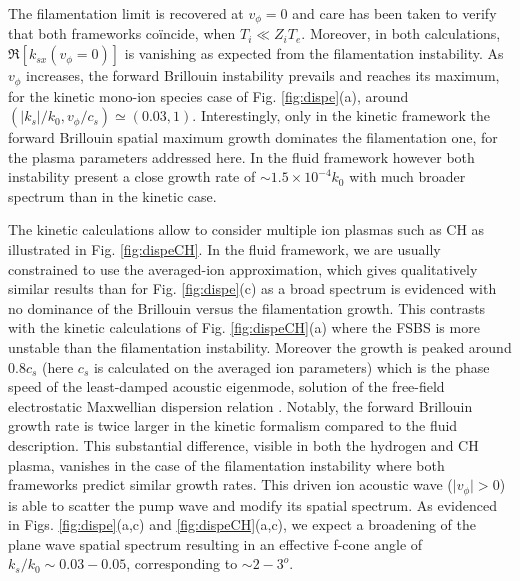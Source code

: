 \documentclass[
 reprint,
 superscriptaddress,
 amsmath,amssymb,
 aps,
]{revtex4-1}
\begin{document}
The filamentation limit is recovered at $v_\phi=0$ and care has been taken to verify that both frameworks co\"incide, when $T_i\ll Z_iT_e$. Moreover, in both calculations, $\Re[k_{sx}(v_\phi=0)]$ is vanishing as expected from the filamentation instability. As $v_\phi$ increases, the forward Brillouin instability prevails and reaches its maximum, for the kinetic  mono-ion species case of Fig. \ref{fig:dispe}(a), around $(\vert k_s\vert/k_0, v_\phi/c_s) \simeq(0.03,1)$. Interestingly, only in the kinetic framework  the forward Brillouin spatial maximum  growth dominates the filamentation one, for the plasma parameters addressed here. In the fluid framework however both instability present a close  growth rate of $\sim 1.5\times 10^{-4} k_0$  with much  broader  spectrum than in the kinetic case.

The kinetic calculations allow to consider multiple ion plasmas such as CH as illustrated in Fig. \ref{fig:dispeCH}. In the fluid framework, we are usually constrained to use the averaged-ion approximation, which gives qualitatively similar results than for Fig. \ref{fig:dispe}(c) as a broad spectrum is evidenced with no dominance of the Brillouin versus the filamentation growth. This contrasts with the kinetic calculations of Fig. \ref{fig:dispeCH}(a) where the FSBS is more unstable than the filamentation instability. Moreover the growth is peaked around $0.8c_s$ (here $c_s$ is calculated on the averaged ion parameters) which is the phase speed of the least-damped acoustic eigenmode, solution of the free-field electrostatic Maxwellian dispersion relation \cite[]{POF_Fried_71,POP_Williams_95}.
Notably, the forward Brillouin growth rate is twice larger in the kinetic formalism compared to the fluid description. This substantial difference, visible in both the hydrogen  and  CH plasma, vanishes in the case of the filamentation instability where both frameworks predict similar growth rates.
This driven ion acoustic wave ($\vert v_\phi\vert >0$) is able to  scatter the pump wave and modify its spatial spectrum. As evidenced in Figs. \ref{fig:dispe}(a,c) and \ref{fig:dispeCH}(a,c), we expect a broadening of the plane wave spatial spectrum  resulting in an effective  f-cone   angle  of $k_s/k_0\sim 0.03-0.05$, corresponding to $\sim 2-3^o$.  
\end{document}
